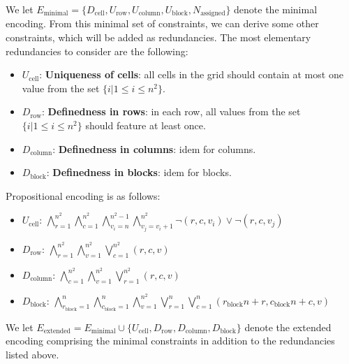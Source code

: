 \documentclass[10pt,a4paper,leqno]{article}
\newcommand{\dcell}{D_{\text{cell}}}
\newcommand{\urow}{U_{\text{row}}}
\newcommand{\ucol}{U_{\text{column}}}
\newcommand{\ublock}{U_{\text{block}}}
\newcommand{\ucell}{U_{\text{cell}}}
\newcommand{\drow}{D_{\text{row}}}
\newcommand{\dcol}{D_{\text{column}}}
\newcommand{\dblock}{D_{\text{block}}}
\begin{document}
We let $E_{\text{minimal}} = \{\dcell,\urow,\ucol,\ublock, N_{\text{assigned}}\}$ denote the minimal encoding. From this minimal set of constraints, we can derive some other constraints, which will be added as redundancies. The most elementary redundancies to consider are the following: 


\begin{itemize}

\item $\ucell$: \textbf{Uniqueness of cells}: all cells in the grid should contain at most one value from the set $\{i | 1 \leq i \leq n^2\}$.

\item $\drow$: \textbf{Definedness in rows}: in each row, all values from the set $\{i | 1 \leq i \leq n^2\}$ should feature at least once. 

\item $\dcol$: \textbf{Definedness in columns}: idem for columns. 

\item $\dblock$: \textbf{Definedness in blocks}: idem for blocks. 

\end{itemize}

Propositional encoding is as follows: 

\begin{itemize}

\item $\ucell$: 
$\bigwedge_{r=1}^{n^2} \bigwedge_{c=1}^{n^2}\bigwedge_{v_i=n}^{n^2 - 1} \bigwedge_{v_j=v_i+1}^{n^2} \neg(r,c,v_i) \lor \neg(r,c,v_j)$


\item $\drow$:
$\bigwedge_{r=1}^{n^2} \bigwedge_{v=1}^{n^2} \bigvee_{c=1}^{n^2} (r,c,v)$

\item $\dcol$: 
$\bigwedge_{c=1}^{n^2} \bigwedge_{v=1}^{n^2} \bigvee_{r=1}^{n^2} (r,c,v)$

\item $\dblock$:  
$\bigwedge_{r_{\text{block}} = 1}^{n} \bigwedge_{c_{\text{block}} = 1}^{n}\bigwedge_{v=1}^{n^2} \bigvee_{r = 1}^{n} \bigvee_{c = 1}^{n} (r_{\text{block}} n + r ,c_{\text{block}} n +c,v) $

\end{itemize}

We let $E_{\text{extended}} = E_{\text{minimal}} \cup \{\ucell,\drow,\dcol,\dblock\}$ denote the extended encoding comprising the minimal constraints in addition to the redundancies listed above. 
\end{document}
